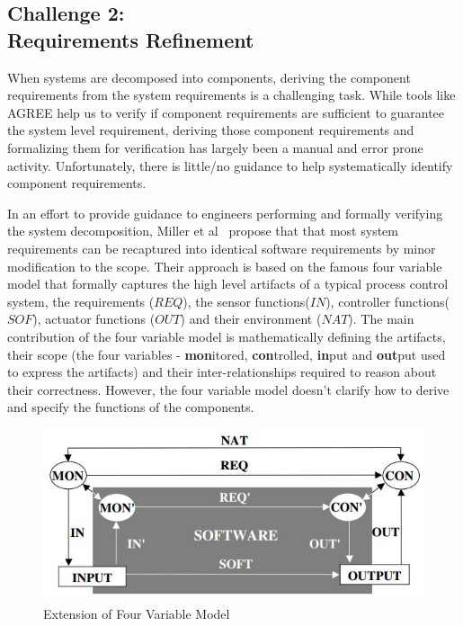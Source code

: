 \subsection{Challenge 2: \\Requirements Refinement}

When systems are decomposed into components, deriving the component requirements from the system requirements is a challenging task. While tools like AGREE help us to verify if component requirements are sufficient to guarantee the system level requirement, deriving those component requirements and formalizing them for verification has largely been a manual and error prone activity. Unfortunately, there is little/no guidance to help systematically identify component requirements.

In an effort to provide guidance to engineers performing and formally verifying the system decomposition, Miller et al~\cite{extending4varmodel} propose that that most system requirements can be recaptured into identical software requirements by minor modification to the scope. Their approach is based on the famous four variable model that formally captures the high level artifacts of a typical process control system, the requirements ($REQ$), the sensor functions($IN$), controller functions($SOF$), actuator functions ($OUT$) and their environment ($NAT$). The main contribution of the four variable model is mathematically defining the artifacts, their scope (the four variables - \textbf{mon}itored, \textbf{con}trolled, \textbf{in}put and \textbf{out}put used to express the artifacts) and their inter-relationships required to reason about their correctness. However, the four variable model doesn't clarify how to derive and specify the functions of the components.

\begin{figure}[h!]
    \centering
    \includegraphics[scale=0.6] {images/FourVarExtn.jpg}
    \caption{Extension of Four Variable Model}
    \label{fig:extn-four-var}
 \end{figure}

